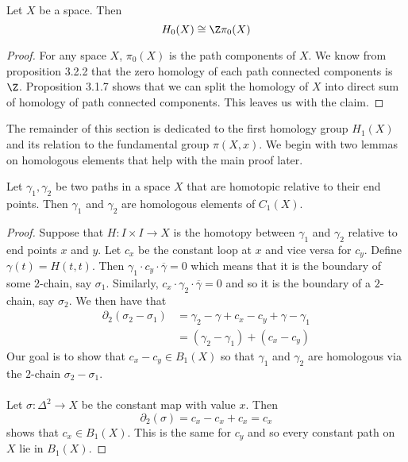 \documentclass[a4paper]{article}
\begin{document}
\begin{crl}{}{} Let $X$ be a space. Then $$H_0(X)\cong\Z\pi_0(X)$$ \tcbline
\begin{proof}
For any space $X$, $\pi_0(X)$ is the path components of $X$. We know from proposition 3.2.2 that the zero homology of each path connected components is $\Z$. Proposition 3.1.7 shows that we can split the homology of $X$ into direct sum of homology of path connected components. This leaves us with the claim. 
\end{proof}
\end{crl}

The remainder of this section is dedicated to the first homology group $H_1(X)$ and its relation to the fundamental group $\pi(X,x)$. We begin with two lemmas on homologous elements that help with the main proof later. 

\begin{lmm}{}{} Let $\gamma_1,\gamma_2$ be two paths in a space $X$ that are homotopic relative to their end points. Then $\gamma_1$ and $\gamma_2$ are homologous elements of $C_1(X)$. \tcbline
\begin{proof}
Suppose that $H:I\times I\to X$ is the homotopy between $\gamma_1$ and $\gamma_2$ relative to end points $x$ and $y$. Let $c_x$ be the constant loop at $x$ and vice versa for $c_y$. Define $\gamma(t)=H(t,t)$. Then $\gamma_1\cdot c_y\cdot \overline{\gamma}=0$ which means that it is the boundary of some $2$-chain, say $\sigma_1$. Similarly, $c_x\cdot\gamma_2\cdot\overline{\gamma}=0$ and so it is the boundary of a $2$-chain, say $\sigma_2$. We then have that 
\begin{align*}
\partial_2(\sigma_2-\sigma_1)&=\gamma_2-\gamma+c_x-c_y+\gamma-\gamma_1\\
&=(\gamma_2-\gamma_1)+(c_x-c_y)
\end{align*}
Our goal is to show that $c_x-c_y\in B_1(X)$ so that $\gamma_1$ and $\gamma_2$ are homologous via the $2$-chain $\sigma_2-\sigma_1$. \\~\\

Let $\sigma:\Delta^2\to X$ be the constant map with value $x$. Then $$\partial_2(\sigma)=c_x-c_x+c_x=c_x$$ shows that $c_x\in B_1(X)$. This is the same for $c_y$ and so every constant path on $X$ lie in $B_1(X)$. 
\end{proof}
\end{lmm}
\end{document}
